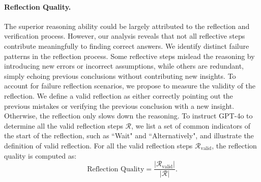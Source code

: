 \paragraph{Reflection Quality.}
The superior reasoning ability could be largely attributed to the reflection and verification process. However, our analysis reveals that not all reflective steps contribute meaningfully to finding correct answers. We identify distinct failure patterns in the reflection process. Some reflective steps mislead the reasoning by introducing new errors or incorrect assumptions, while others are redundant, simply echoing previous conclusions without contributing new insights. To account for failure reflection scenarios, we propose to measure the validity of the reflection. We define a valid reflection as either correctly pointing out the previous mistakes or verifying the previous conclusion with a new insight. Otherwise, the reflection only slows down the reasoning.
To instruct GPT-4o to determine all the valid reflection steps $\mathcal{R}$, we list a set of common indicators of the start of the reflection, such as ``Wait" and ``Alternatively", and illustrate the definition of valid reflection. For all the valid reflection steps $\mathcal{R}_\text{valid}$, the reflection quality is computed as:
\begin{equation}
    \text{Reflection Quality} =  \frac{\left| {\mathcal{R}}_{\text{valid}} \right|}{\left| \mathcal{R} \right|}.
\end{equation}

